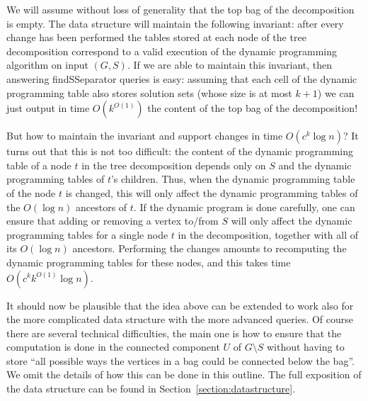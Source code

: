\documentclass[a4paper,11pt]{article}
\theoremstyle{definition}
\theoremstyle{remark}
\newcommand{\qSsep}{\textnormal{findSSeparator}}
\begin{document}
We will assume without loss of generality that the top bag of the
decomposition is empty.  The data structure will maintain the
following invariant: after every change has been performed the tables
stored at each node of the tree decomposition correspond to a valid
execution of the dynamic programming algorithm on input $(G,S)$.  If
we are able to maintain this invariant, then answering \qSsep{}
queries is easy: assuming that each cell of the dynamic programming
table also stores solution sets (whose size is at most $k+1$) we can
just output in time $O(k^{O(1)})$ the content of the top bag of the
decomposition!

But how to maintain the invariant and support changes in time
$O(c^k\log n)$? It turns out that this is not too difficult: the
content of the dynamic programming table of a node $t$ in the tree
decomposition depends only on $S$ and the dynamic programming tables
of $t$'s children.  Thus, when the dynamic programming table of the
node $t$ is changed, this will only affect the dynamic programming
tables of the $O(\log n)$ ancestors of $t$.  If the dynamic program is
done carefully, one can ensure that adding or removing a vertex
to/from $S$ will only affect the dynamic programming tables for a
single node $t$ in the decomposition, together with all of its $O(\log
n)$ ancestors.  Performing the changes amounts to recomputing the
dynamic programming tables for these nodes, and this takes time
$O(c^kk^{O(1)}\log n)$.

It should now be plausible that the idea above can be extended to work
also for the more complicated data structure with the more advanced
queries.  Of course there are several technical difficulties, the main
one is how to ensure that the computation is done in the connected
component $U$ of $G \setminus S$ without having to store ``all
possible ways the vertices in a bag could be connected below the
bag''.  We omit the details of how this can be done in this outline.
The full exposition of the data structure can be found in
Section~\ref{section:datastructure}.
\end{document}

